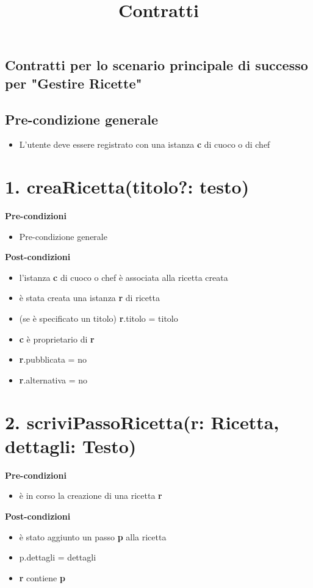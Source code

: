 \documentclass[12pt]{extarticle}
\begin{document}
\title{Contratti}
\date{}
\maketitle

\subsection*{Contratti per lo scenario principale di successo per "Gestire Ricette"}

\subsection*{Pre-condizione generale}
\begin{itemize}
  \item L'utente deve essere registrato con una istanza \textbf{c} di cuoco o di chef
\end{itemize}

\section*{1. creaRicetta(titolo?: testo)}
\textbf{Pre-condizioni}
\begin{itemize}
  \item Pre-condizione generale
\end{itemize}
\textbf{Post-condizioni}
\begin{itemize}
  \item l'istanza \textbf{c} di cuoco o chef è associata alla ricetta creata
  \item è stata creata una istanza \textbf{r} di ricetta
  \item (se è specificato un titolo) \textbf{r}.titolo = titolo
  \item \textbf{c} è proprietario di \textbf{r}
  \item \textbf{r}.pubblicata = no
  \item \textbf{r}.alternativa = no
\end{itemize}

\section*{2. scriviPassoRicetta(r: Ricetta, dettagli: Testo)}

\textbf{Pre-condizioni} 	
\begin{itemize}
  \item è in corso la creazione di una ricetta  \textbf{r}
\end{itemize}
\textbf{Post-condizioni}
\begin{itemize}
  \item è stato aggiunto un passo  \textbf{p} alla ricetta
  \item p.dettagli = dettagli
  \item  \textbf{r} contiene  \textbf{p}
\end{itemize}
\end{document}
